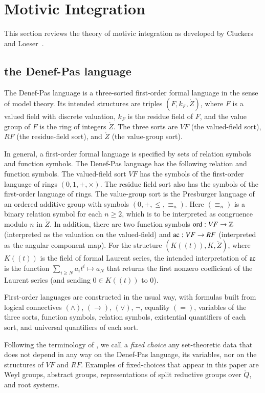 \section{Motivic Integration}

This section reviews the theory of motivic integration as developed by
Cluckers and Loeser~\cite{cluckers2008constructible}.

\subsection{the Denef-Pas language}

The Denef-Pas language is a three-sorted first-order formal language
in the sense of model theory.  Its intended structures are triples
$(F,k_F,\ring{Z})$, where $F$ is a valued field with discrete
valuation, $k_F$ is the residue field of $F$, and the value group of
$F$ is the ring of integers $\ring{Z}$.  The three sorts are $VF$
(the valued-field sort), $RF$ (the residue-field sort), and $\ring{Z}$
(the value-group sort).

In general, a first-order formal language is specified by sets of
relation symbols and function symbols.  The Denef-Pas language has the
following relation and function symbols.  The valued-field sort $VF$
has the symbols of the first-order language of rings $(0,1,+,\times)$.
The residue field sort also has the symbols of the first-order
language of rings.  The value-group sort is the Presburger language of
an ordered additive group with symbols $(0,+,\le,\equiv_n)$.  Here
$(\equiv_n)$ is a binary relation symbol for each $n\ge 2$, which is
to be interpreted as congruence modulo $n$ in $\ring{Z}$.  In
addition, there are two function symbols ${\operatorname{ord}}:VF\to\mathbb{Z}$
(interpreted as the valuation on the valued-field) and ${\operatorname{ac}}:VF\to
RF$ (interpreted as the angular component map).  For the structure
$(K((t)),K,\ring{Z})$, where $K((t))$ is the field of formal Laurent
series, the intended interpretation of ${\operatorname{ac}}$ is the function
$\sum_{i\ge N} a_i t^i\mapsto a_N$ that returns the first nonzero
coefficient of the Laurent series (and sending $0\in K((t))$ to $0$).

First-order languages are constructed in the usual way, with formulas
built from logical connectives $(\land)$, $(\to)$, $(\lor)$, $\neg$,
equality $(=)$, variables of the three sorts, function symbols,
relation symbols, existential quantifiers of each sort, and universal
quantifiers of each sort.

Following the terminology of \cite{gordon}, we call a {\it fixed
  choice} any set-theoretic data that does not depend in any way on
the Denef-Pas language, its variables, nor on the structures of $VF$
and $RF$.  Examples of fixed-choices that appear in this paper are
Weyl groups, abstract groups, representations of split reductive
groups over $\ring{Q}$, and root systems.

